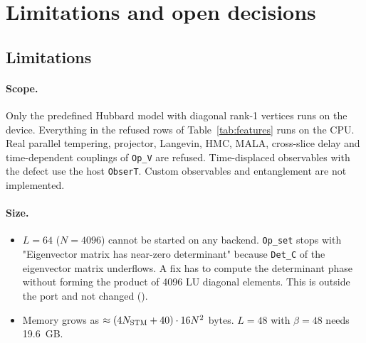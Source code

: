 \section{Limitations and open decisions}
\label{sec:limits}

\subsection{Limitations}

\paragraph{Scope.} Only the predefined Hubbard model with diagonal rank-1 vertices runs on the device. Everything in the refused rows of Table~\ref{tab:features} runs on the CPU. Real parallel tempering, projector, Langevin, HMC, MALA, cross-slice delay and time-dependent couplings of \texttt{Op\_V} are refused. Time-displaced observables with the defect use the host \texttt{ObserT}. Custom observables and entanglement are not implemented.

\paragraph{Size.}
\begin{itemize}
\item $L=64$ ($N=4096$) cannot be started on any backend. \texttt{Op\_set} stops with "Eigenvector matrix has near-zero determinant" because \texttt{Det\_C} of the eigenvector matrix underflows. A fix has to compute the determinant phase without forming the product of 4096 LU diagonal elements. This is outside the port and not changed ().
\item Memory grows as $\approx(4N_{\rm STM}+40)\cdot16N^2$ bytes. $L=48$ with $\beta=48$ needs 19.6~GB.
\end{itemize}

